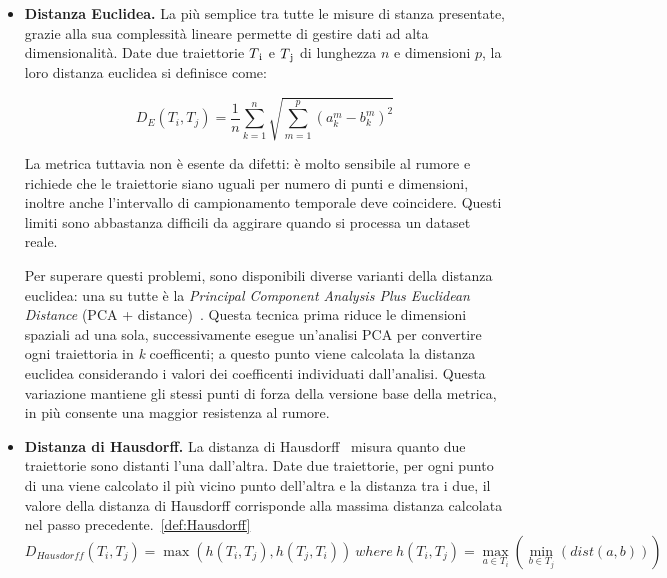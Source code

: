 \begin{itemize}

  \item \textbf{Distanza Euclidea.}
  La più semplice tra tutte le misure di stanza presentate, grazie alla sua complessità lineare permette di gestire dati ad alta dimensionalità.
  Date due traiettorie  \(T\textsubscript{i}\) e  \(T\textsubscript{j}\) di lunghezza \(n\) e dimensioni \(p\), la loro distanza euclidea si definisce come:

  \begin{equation}
    {D_E(T_{i}, T_{j}) = { {\frac{1}{n} } \sum_{k=1}^{n} {\sqrt{\sum_{m=1}^{p}{(a_{k}^{m} - b_{k}^{m})}^2}}}}
  \end{equation}

  La metrica tuttavia non è esente da difetti: è molto sensibile al rumore e richiede che le traiettorie siano uguali per numero di punti
  e dimensioni, inoltre anche l'intervallo di campionamento temporale deve coincidere. Questi limiti sono abbastanza difficili da
  aggirare quando si processa un dataset reale.

  Per superare questi problemi, sono disponibili diverse varianti della distanza euclidea: una su tutte è la \textit{Principal Component Analysis Plus Euclidean Distance} (PCA + distance)~\cite{zhang2006comparison}.
  Questa tecnica prima riduce le dimensioni spaziali ad una sola, successivamente esegue un'analisi PCA per convertire ogni traiettoria in
  \textit{k} coefficenti; a questo punto viene calcolata la distanza euclidea considerando i valori dei coefficenti individuati dall'analisi.
  Questa variazione mantiene gli stessi punti di forza della versione base della metrica, in più consente una maggior resistenza al rumore.



  \item \textbf{Distanza di Hausdorff.}
  La distanza di Hausdorff~\cite{chen2011clustering} misura quanto due traiettorie sono distanti l'una dall'altra.
  Date due traiettorie, per ogni punto di una viene calcolato il più vicino punto dell'altra e la distanza tra i due, il valore della distanza di Hausdorff
  corrisponde alla massima distanza calcolata nel passo precedente.~\cref{def:Hausdorff}
  \begin{equation} \label{def:Hausdorff}
    {D_{Hausdorff}(T_{i}, T_{j}) = \max{(h(T_{i}, T_{j}), h(T_{j}, T_{i}))}}~where~{h(T_{i}, T_{j}) = \max_{a \in T_{i}}{(\min_{b \in T_{j}}{(dist(a,b))})}}
  \end{equation}


\end{itemize}
